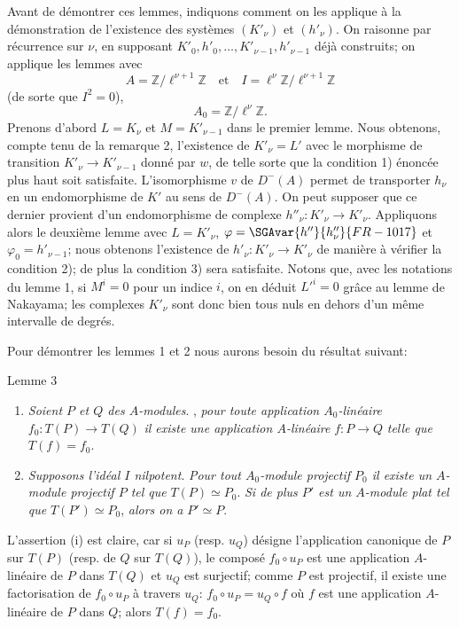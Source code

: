 Avant de démontrer ces lemmes, indiquons comment on les applique à la démonstration de l'existence des systèmes $(K'_\nu)$ et $(h'_\nu)$. On raisonne par récurrence sur $\nu$, en supposant $K'_0,h'_0,\ldots,K'_{\nu-1},h'_{\nu-1}$ déjà construits; on applique les lemmes avec
\[
A=\mathbb{Z}/\ell^{\nu+1}\mathbb{Z}
\quad\text{et}\quad
I=\ell^\nu\mathbb{Z}/\ell^{\nu+1}\mathbb{Z}
\]
(de sorte que $I^2=0$),
\[
A_0=\mathbb{Z}/\ell^\nu\mathbb{Z}.
\]
Prenons d'abord $L=K_\nu$ et $M=K'_{\nu-1}$ dans le premier lemme. Nous obtenons, compte tenu de la remarque 2, l'existence de $K'_\nu=L'$ avec le morphisme de transition $K'_\nu\to K'_{\nu-1}$ donné par $w$, de telle sorte que la condition 1) énoncée plus haut soit satisfaite. L'isomorphisme $v$ de $D^-(A)$ permet de transporter $h_\nu$ en un endomorphisme de $K'$ au sens de $D^-(A)$. On peut supposer que ce dernier provient d'un endomorphisme de complexe $h''_\nu:K'_\nu\to K'_\nu$. Appliquons alors le deuxième lemme avec $L=K'_\nu$, 
$\varphi=\SGAvar{h''}{h''_\nu}{FR-1017}$ et $\varphi_0=h'_{\nu-1}$;
nous obtenons l'existence de $h'_\nu:K'_\nu\to K'_\nu$ de manière à vérifier la condition 2); de plus la condition 3) sera satisfaite. Notons que, avec les notations du lemme 1, si $M^i=0$ pour un indice $i$, on en déduit $L'^i=0$ grâce au lemme de Nakayama; les complexes $K'_\nu$ sont donc bien tous nuls en dehors d'un même intervalle de degrés.

Pour démontrer les lemmes 1 et 2 nous aurons besoin du résultat suivant:

\begin{statement}{Lemme 3}
\begin{enumerate}[label=(\roman*)]
\item \emph{Soient $P$ et $Q$ des $A$-modules}. , \emph{pour toute application $A_0$-linéaire} $f_0:T(P)\to T(Q)$ \emph{il existe une application $A$-linéaire} $f:P\to Q$ \emph{telle que} $T(f)=f_0$.
\item \emph{Supposons l'idéal $I$ nilpotent}. \emph{Pour tout $A_0$-module projectif $P_0$ il existe un $A$-module projectif $P$ tel que} $T(P)\simeq P_0$. \emph{Si de plus $P'$ est un $A$-module plat tel que} $T(P')\simeq P_0$, \emph{alors on a} $P'\simeq P$.
\end{enumerate}
\end{statement}

L'assertion (i) est claire, car si $u_P$ (resp. $u_Q$) désigne l'application canonique de $P$ sur $T(P)$ (resp. de $Q$ sur $T(Q)$), le composé $f_0\circ u_P$ est une application $A$-linéaire de $P$ dans $T(Q)$ et $u_Q$ est surjectif; comme $P$ est projectif, il existe une factorisation de $f_0\circ u_P$ à travers $u_Q$: $f_0\circ u_P=u_Q\circ f$ où $f$ est une application $A$-linéaire de $P$ dans $Q$; alors $T(f)=f_0$.


